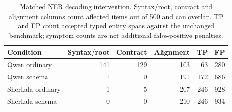 \begin{table}[t]
\centering\footnotesize
\caption{Matched NER decoding intervention. Syntax/root, contract and alignment columns count affected items out of 500 and can overlap. TP and FP count accepted typed entity spans against the unchanged benchmark; symptom counts are not additional false-positive penalties.}
\label{tab:schema-diagnostics}
\begin{tabular}{lrrrrr}
\toprule
Condition & Syntax/root & Contract & Alignment & TP & FP\\
\midrule
Qwen ordinary & 141 & 129 & 103 & 63 & 280\\
Qwen schema & 1 & 0 & 191 & 172 & 686\\
Sherkala ordinary & 1 & 5 & 207 & 246 & 928\\
Sherkala schema & 0 & 0 & 210 & 246 & 934\\
\bottomrule
\end{tabular}
\end{table}
